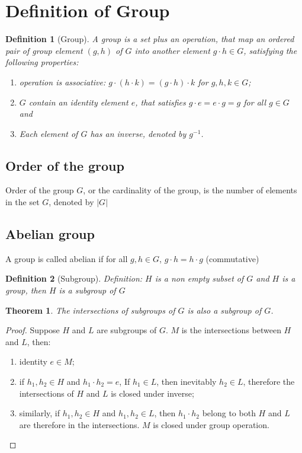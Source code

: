 \documentclass{amsart}
\newtheorem{definition}{Definition}
\newtheorem{theorem}{Theorem}
\begin{document}
\section*{Definition of Group}
\begin{definition}[Group]
    A group is a set plus an operation, that map an ordered pair of group element $(g,h)$ of $G$ into another element $g\cdot h \in G$, satisfying
    the following properties:
    \begin{enumerate}
        \item operation is associative: $g\cdot (h \cdot k) = (g\cdot h) \cdot k$ for $g,h,k \in G$;
        \item $G$ contain an identity element $e$, that satisfies $g\cdot e = e\cdot g = g$ for all $g \in G$ and 
        \item Each element of $G$ has an inverse, denoted by $g^{-1}$.
    \end{enumerate}  
\end{definition}

\subsection*{Order of the group}
    Order of the group $G$, or the cardinality of the group, is the number of elements in the set $G$, denoted by $|G|$
\vspace{-10pt} %
\subsection*{Abelian group}
    A group is called abelian if for all $g, h \in G$, $g\cdot h = h \cdot g$ (commutative)


\begin{definition}[Subgroup]
    Definition: $H$ is a non empty subset of $G$ and $H$ is a group, then $H$ is a subgroup of $G$
\end{definition}

\begin{theorem}
    The intersections of subgroups of $G$ is also a subgroup of $G$.
\end{theorem}
\begin{proof}
    Suppose $H$ and $L$ are subgroups of $G$. $M$ is the intersections between $H$ and $L$, then:
    \begin{enumerate}
        \item identity $e \in M$;
        \item if $h_1, h_2 \in H$ and $h_1 \cdot h_2 = e$, If $h_1\in L$, then inevitably $h_2 \in L$, therefore the intersections of $H$ and $L$ is closed under inverse;
        \item similarly, if $h_1, h_2 \in H$ and $h_1, h_2 \in L$, then $h_1\cdot h_2$ belong to both $H$ and $L$ are therefore in the intersections. $M$ is closed under group operation.
    \end{enumerate}
\end{proof}
\end{document}
